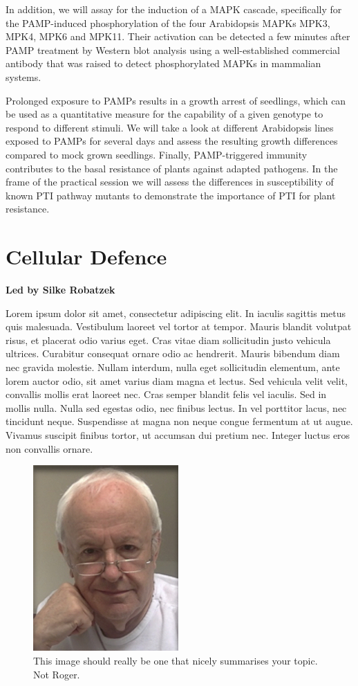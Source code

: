 \documentclass[12pt,]{book}
\begin{document}
In addition, we will assay for the induction of a MAPK cascade,
specifically for the PAMP-induced phosphorylation of the four
Arabidopsis MAPKs MPK3, MPK4, MPK6 and MPK11. Their activation can be
detected a few minutes after PAMP treatment by Western blot analysis
using a well-established commercial antibody that was raised to detect
phosphorylated MAPKs in mammalian systems.

Prolonged exposure to PAMPs results in a growth arrest of seedlings,
which can be used as a quantitative measure for the capability of a
given genotype to respond to different stimuli. We will take a look at
different Arabidopsis lines exposed to PAMPs for several days and assess
the resulting growth differences compared to mock grown seedlings.
Finally, PAMP-triggered immunity contributes to the basal resistance of
plants against adapted pathogens. In the frame of the practical session
we will assess the differences in susceptibility of known PTI pathway
mutants to demonstrate the importance of PTI for plant resistance.

\chapter*{Cellular Defence}\label{cellular-defence}

\textbf{Led by Silke Robatzek}

Lorem ipsum dolor sit amet, consectetur adipiscing elit. In iaculis
sagittis metus quis malesuada. Vestibulum laoreet vel tortor at tempor.
Mauris blandit volutpat risus, et placerat odio varius eget. Cras vitae
diam sollicitudin justo vehicula ultrices. Curabitur consequat ornare
odio ac hendrerit. Mauris bibendum diam nec gravida molestie. Nullam
interdum, nulla eget sollicitudin elementum, ante lorem auctor odio, sit
amet varius diam magna et lectus. Sed vehicula velit velit, convallis
mollis erat laoreet nec. Cras semper blandit felis vel iaculis. Sed in
mollis nulla. Nulla sed egestas odio, nec finibus lectus. In vel
porttitor lacus, nec tincidunt neque. Suspendisse at magna non neque
congue fermentum at ut augue. Vivamus suscipit finibus tortor, ut
accumsan dui pretium nec. Integer luctus eros non convallis ornare.

\begin{figure}
\includegraphics[width=2.19in]{assets/RPF-thumbnail} \caption{This image should really be one that nicely summarises your topic. Not Roger.}\label{fig:maincd}
\end{figure}
\end{document}
